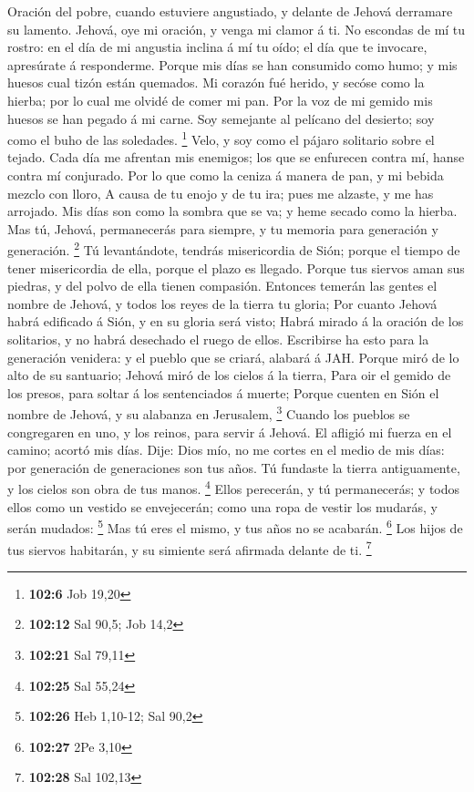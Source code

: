  Oración del pobre, cuando estuviere angustiado, y delante
de Jehová derramare su lamento. Jehová, oye mi oración, y venga mi
clamor á ti.  No escondas de mí tu rostro: en el día de mi
angustia inclina á mí tu oído; el día que te invocare, apresúrate á
responderme.  Porque mis días se han consumido como humo; y
mis huesos cual tizón están quemados.  Mi corazón fué
herido, y secóse como la hierba; por lo cual me olvidé de comer mi pan.
 Por la voz de mi gemido mis huesos se han pegado á mi
carne.  Soy semejante al pelícano del desierto; soy como el
buho de las soledades. \footnote{\textbf{102:6} Job 19,20} 
Velo, y soy como el pájaro solitario sobre el tejado.  Cada
día me afrentan mis enemigos; los que se enfurecen contra mí, hanse
contra mí conjurado.  Por lo que como la ceniza á manera de
pan, y mi bebida mezclo con lloro,  A causa de tu enojo y
de tu ira; pues me alzaste, y me has arrojado.  Mis días
son como la sombra que se va; y heme secado como la hierba.
 Mas tú, Jehová, permanecerás para siempre, y tu memoria
para generación y generación. \footnote{\textbf{102:12} Sal 90,5; Job
  14,2}  Tú levantándote, tendrás misericordia de Sión;
porque el tiempo de tener misericordia de ella, porque el plazo es
llegado.  Porque tus siervos aman sus piedras, y del polvo
de ella tienen compasión.  Entonces temerán las gentes el
nombre de Jehová, y todos los reyes de la tierra tu gloria;
 Por cuanto Jehová habrá edificado á Sión, y en su gloria
será visto;  Habrá mirado á la oración de los solitarios, y
no habrá desechado el ruego de ellos.  Escribirse ha esto
para la generación venidera: y el pueblo que se criará, alabará á JAH.
 Porque miró de lo alto de su santuario; Jehová miró de los
cielos á la tierra,  Para oir el gemido de los presos, para
soltar á los sentenciados á muerte;  Porque cuenten en Sión
el nombre de Jehová, y su alabanza en Jerusalem, \footnote{\textbf{102:21}
  Sal 79,11}  Cuando los pueblos se congregaren en uno, y
los reinos, para servir á Jehová.  El afligió mi fuerza en
el camino; acortó mis días.  Dije: Dios mío, no me cortes
en el medio de mis días: por generación de generaciones son tus años.
 Tú fundaste la tierra antiguamente, y los cielos son obra
de tus manos. \footnote{\textbf{102:25} Sal 55,24}  Ellos
perecerán, y tú permanecerás; y todos ellos como un vestido se
envejecerán; como una ropa de vestir los mudarás, y serán mudados:
\footnote{\textbf{102:26} Heb 1,10-12; Sal 90,2}  Mas tú
eres el mismo, y tus años no se acabarán. \footnote{\textbf{102:27} 2Pe
  3,10}  Los hijos de tus siervos habitarán, y su simiente
será afirmada delante de ti. \footnote{\textbf{102:28} Sal 102,13}

